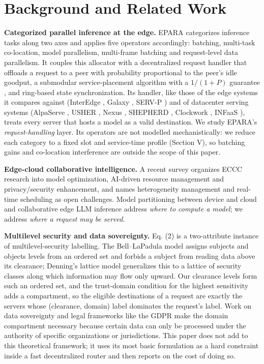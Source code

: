 \documentclass[journal]{IEEEtran}
\begin{document}
\section{Background and Related Work}

\textbf{Categorized parallel inference at the edge.} EPARA \cite{epara2025} categorizes inference tasks along two axes and applies five operators accordingly: batching, multi-task co-location, model parallelism, multi-frame batching and request-level data parallelism. It couples this allocator with a decentralized request handler that offloads a request to a peer with probability proportional to the peer's idle goodput, a submodular service-placement algorithm with a \(1/(1+P)\) guarantee \cite{fisher1978submodular}, and ring-based state synchronization. Its handler, like those of the edge systems it compares against (InterEdge \cite{interedge}, Galaxy \cite{galaxy}, SERV-P \cite{servp}) and of datacenter serving systems (AlpaServe \cite{alpaserve}, USHER \cite{usher}, Nexus \cite{nexus}, SHEPHERD \cite{shepherd}, Clockwork \cite{clockwork}, INFaaS \cite{infaas}), treats every server that hosts a model as a valid destination. We study EPARA's \emph{request-handling} layer. Its operators are not modelled mechanistically: we reduce each category to a fixed slot and service-time profile (Section V), so batching gains and co-location interference are outside the scope of this paper.

\textbf{Edge-cloud collaborative intelligence.} A recent survey \cite{liu2025eccc} organizes ECCC research into model optimization, AI-driven resource management and privacy/security enhancement, and names heterogeneity management and real-time scheduling as open challenges. Model partitioning between device and cloud \cite{neurosurgeon} and collaborative edge LLM inference \cite{edgeshard} address \emph{where to compute a model}; we address \emph{where a request may be served}.

\textbf{Multilevel security and data sovereignty.} Eq. (2) is a two-attribute instance of multilevel-security labelling. The Bell--LaPadula model \cite{bell1973} assigns subjects and objects levels from an ordered set and forbids a subject from reading data above its clearance; Denning's lattice model \cite{denning1976} generalizes this to a lattice of security classes along which information may flow only upward. Our clearance levels form such an ordered set, and the trust-domain condition for the highest sensitivity adds a compartment, so the eligible destinations of a request are exactly the servers whose (clearance, domain) label dominates the request's label. Work on data sovereignty \cite{hummel2021} and legal frameworks like the GDPR \cite{gdpr} make the domain compartment necessary because certain data can only be processed under the authority of specific organizations or jurisdictions. This paper does not add to this theoretical framework; it uses its most basic formulation as a hard constraint inside a fast decentralized router and then reports on the cost of doing so.
\end{document}
